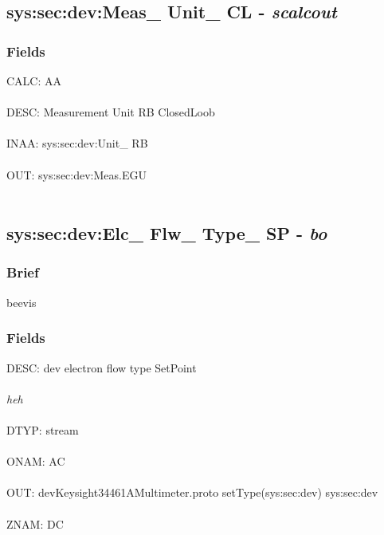 \documentclass[12pt]{article}
\begin{document}
\subsection{sys:sec:dev:Meas\_ Unit\_ CL - \textit{scalcout}}
\subsubsection{Fields}
CALC: AA\\\\ DESC: Measurement Unit RB ClosedLoob\\\\ INAA: sys:sec:dev:Unit\_ RB\\\\ OUT: sys:sec:dev:Meas.EGU\\\\ \newpage
\subsection{sys:sec:dev:Elc\_ Flw\_ Type\_ SP - \textit{bo}}
\subsubsection{Brief}
beevis
\subsubsection{Fields}
DESC: dev electron flow type SetPoint\\\\ \textit{heh}\\\\ 
DTYP: stream\\\\ ONAM: AC\\\\ OUT: devKeysight34461AMultimeter.proto setType(sys:sec:dev) sys:sec:dev\\\\ ZNAM: DC\\\\ 
\end{document}

